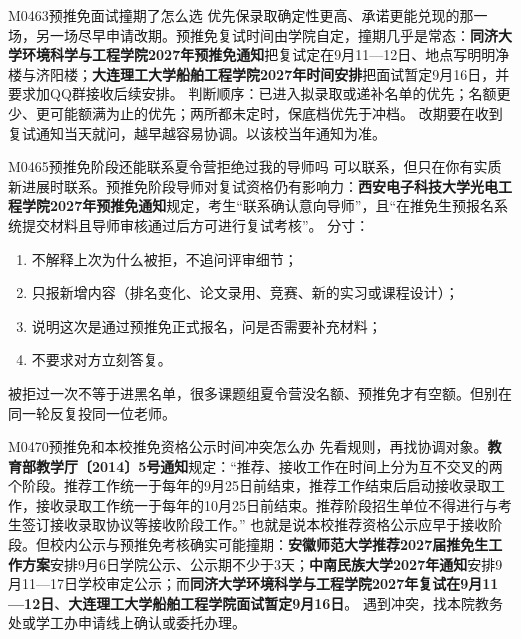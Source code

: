 \begin{qa}{M0463}{预推免面试撞期了怎么选}
优先保录取确定性更高、承诺更能兑现的那一场，另一场尽早申请改期。预推免复试时间由学院自定，撞期几乎是常态：\textbf{同济大学环境科学与工程学院2027年预推免通知}把复试定在9月11—12日、地点写明明净楼与济阳楼；\textbf{大连理工大学船舶工程学院2027年时间安排}把面试暂定9月16日，并要求加QQ群接收后续安排。
判断顺序：已进入拟录取或递补名单的优先；名额更少、更可能额满为止的优先；两所都未定时，保底档优先于冲档。
改期要在收到复试通知当天就问，越早越容易协调。以该校当年通知为准。
\end{qa}

\begin{qa}{M0465}{预推免阶段还能联系夏令营拒绝过我的导师吗}
可以联系，但只在你有实质新进展时联系。预推免阶段导师对复试资格仍有影响力：\textbf{西安电子科技大学光电工程学院2027年预推免通知}规定，考生“联系确认意向导师”，且“在推免生预报名系统提交材料且导师审核通过后方可进行复试考核”。
分寸：
\begin{enumerate}
  \item 不解释上次为什么被拒，不追问评审细节；
  \item 只报新增内容（排名变化、论文录用、竞赛、新的实习或课程设计）；
  \item 说明这次是通过预推免正式报名，问是否需要补充材料；
  \item 不要求对方立刻答复。
\end{enumerate}
被拒过一次不等于进黑名单，很多课题组夏令营没名额、预推免才有空额。但别在同一轮反复投同一位老师。
\end{qa}

\begin{qa}{M0470}{预推免和本校推免资格公示时间冲突怎么办}
先看规则，再找协调对象。\textbf{教育部教学厅〔2014〕5号通知}规定：“推荐、接收工作在时间上分为互不交叉的两个阶段。推荐工作统一于每年的9月25日前结束，推荐工作结束后启动接收录取工作，接收录取工作统一于每年的10月25日前结束。推荐阶段招生单位不得进行与考生签订接收录取协议等接收阶段工作。”
也就是说本校推荐资格公示应早于接收阶段。但校内公示与预推免考核确实可能撞期：\textbf{安徽师范大学推荐2027届推免生工作方案}安排9月6日学院公示、公示期不少于3天；\textbf{中南民族大学2027年通知}安排9月11—17日学校审定公示；而\textbf{同济大学环境科学与工程学院2027年复试在9月11—12日}、\textbf{大连理工大学船舶工程学院面试暂定9月16日}。
遇到冲突，找本院教务处或学工办申请线上确认或委托办理。
\end{qa}

